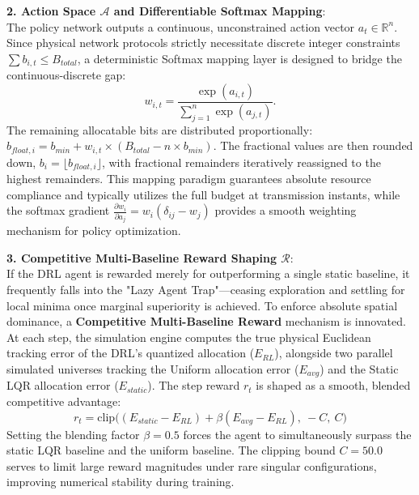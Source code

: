 \vspace{0.5em}
\noindent\textbf{2. Action Space $\mathcal{A}$ and Differentiable Softmax Mapping}:\\
The policy network outputs a continuous, unconstrained action vector $a_t \in \mathbb{R}^n$. Since physical network protocols strictly necessitate discrete integer constraints $\sum b_{i,t} \le B_{total}$, a deterministic Softmax mapping layer is designed to bridge the continuous-discrete gap:
\begin{equation}
    w_{i,t} = \frac{\exp(a_{i,t})}{\sum_{j=1}^n \exp(a_{j,t})}.
\end{equation}
The remaining allocatable bits are distributed proportionally: $b_{float, i} = b_{min} + w_{i,t} \times (B_{total} - n \times b_{min})$. The fractional values are then rounded down, $b_i=\lfloor b_{float, i} \rfloor$, with fractional remainders iteratively reassigned to the highest remainders. This mapping paradigm guarantees absolute resource compliance and typically utilizes the full budget at transmission instants, while the softmax gradient $\frac{\partial w_i}{\partial a_j} = w_i (\delta_{ij} - w_j)$ provides a smooth weighting mechanism for policy optimization.

\vspace{0.5em}
\noindent\textbf{3. Competitive Multi-Baseline Reward Shaping $\mathcal{R}$}:\\
If the DRL agent is rewarded merely for outperforming a single static baseline, it frequently falls into the "Lazy Agent Trap"—ceasing exploration and settling for local minima once marginal superiority is achieved. To enforce absolute spatial dominance, a \textbf{Competitive Multi-Baseline Reward} mechanism is innovated.
At each step, the simulation engine computes the true physical Euclidean tracking error of the DRL's quantized allocation ($E_{RL}$), alongside two parallel simulated universes tracking the Uniform allocation error ($E_{avg}$) and the Static LQR allocation error ($E_{static}$). The step reward $r_t$ is shaped as a smooth, blended competitive advantage:
\begin{equation} \label{eq:reward_shaping}
    r_t = \text{clip}\Big( (E_{static} - E_{RL}) + \beta (E_{avg} - E_{RL}), \ -C, \ C \Big)
\end{equation}
Setting the blending factor $\beta = 0.5$ forces the agent to simultaneously surpass the static LQR baseline and the uniform baseline. The clipping bound $C = 50.0$ serves to limit large reward magnitudes under rare singular configurations, improving numerical stability during training.

